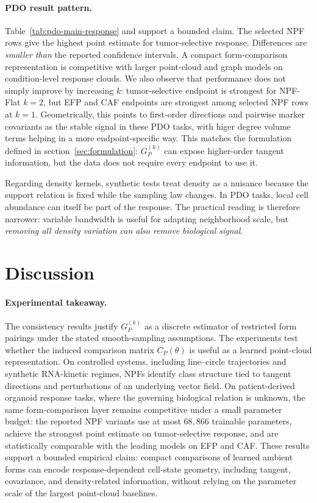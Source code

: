 \documentclass{article}
\theoremstyle{remark}
\theoremstyle{plain}
\begin{document}
\paragraph{PDO result pattern.} Table~\ref{tab:pdo-main-response} and support a bounded claim. The selected NPF rows give the highest point estimate for tumor-selective response. Differences are \emph{smaller than} the reported confidence intervals. A compact form-comparison representation is competitive with larger point-cloud and graph models on condition-level response clouds. We also observe that performance does not simply improve by increasing \(k\): tumor-selective endpoint is strongest for NPF-Flat \(k=2\), but EFP and CAF endpoints are strongest among selected NPF rows at \(k=1\). Geometrically, this points to first-order directions and pairwise marker covariants as the stable signal in these PDO tasks, with higer degree volume terms helping in a more endpoint-specific way. This matches the formulation defined in section~\ref{sec:formulation}: \(G_P^{(k)}\) can expose higher-order tangent information, but the data does not require every endpoint to use it. 

Regarding density kernels, synthetic tests treat density as a nuisance because the support relation is fixed while the sampling law changes. In PDO tasks, local cell abundance can itself be part of the response. The practical reading is therefore narrower: variable bandwidth is useful for adapting neighborhood scale, but \textit{removing all density variation can also remove biological signal}. 





\section{Discussion}
\paragraph{Experimental takeaway.} The consistency results justify \(G_P^{(k)}\) as a discrete estimator of restricted form pairings under the stated smooth-sampling assumptions. The experiments test whether the induced comparison matrix \(C_P(\theta)\) is useful as a learned point-cloud representation. On controlled systems, including line--circle trajectories and synthetic RNA-kinetic regimes, NPFs identify class structure tied to tangent directions and perturbations of an underlying vector field. On patient-derived organoid response tasks, where the governing biological relation is unknown, the same form-comparison layer remains competitive under a small parameter budget: the reported NPF variants use at most \(68{,}866\) trainable parameters, achieve the strongest point estimate on tumor-selective response, and are statistically comparable with the leading models on EFP and CAF. These results support a bounded empirical claim: compact comparisons of learned ambient forms can encode response-dependent cell-state geometry, including tangent, covariance, and density-related information, without relying on the parameter scale of the largest point-cloud baselines. 
\end{document}
